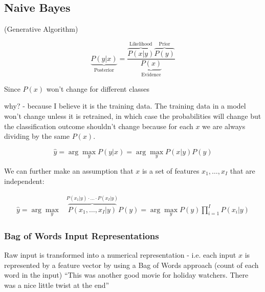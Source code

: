 \documentclass[11pt]{article}
\begin{document}
\subsection{Naive Bayes}

(Generative Algorithm)

\begin{definition}
    \begin{equation*}
        \underbrace{P(y|x)}_\text{Posterior} = \frac{\overbrace{P(x|y)}^\text{Likelihood}\overbrace{P(y)}^\text{Prior}}{\underbrace{P(x)}_\text{Evidence}}
    \end{equation*}
\end{definition}

Since $P(x)$ won't change for different classes

\begin{warning}
    why? - because I believe it is the training data. The training data in a model won't change unless it is retrained, in which case the probabilities will change but the classification outcome shouldn't change because for each $x$ we are always dividing by the same $P(x)$.
\end{warning}

\begin{equation*}
    \hat{y} = \arg \max_y P(y|x) = \arg \max_y P(x|y)P(y)
\end{equation*}

We can further make an assumption that $x$ is a set of features $x_1, \ldots, x_I$ that are independent:

\begin{definition}\label{eq:naiive-bayes-classifier}
    \begin{align*}
        \hat{y} = \arg \max_y & \overbrace{P(x_1, \ldots, x_I|y)}^{P(x_1|y) \cdot \ldots \cdot P(x_I|y)}P(y) = \arg \max_y P(y) \prod ^ I _{i=1} P(x_i|y)
    \end{align*}
\end{definition}

\subsubsection{Bag of Words Input Representations}

Raw input is transformed into a numerical representation - i.e. each input $x$ is represented by a feature vector by using a Bag of Words approach (count of each word in the input)
``This was another good movie for holiday watchers. There was a nice little twist at the end''
\end{document}
